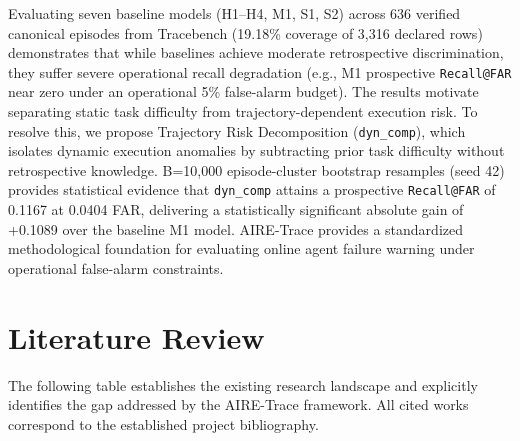 \documentclass[12pt,a4paper]{article}
\begin{document}
Evaluating seven baseline models (H1--H4, M1, S1, S2) across 636 verified canonical episodes from Tracebench (19.18\% coverage of 3,316 declared rows) demonstrates that while baselines achieve moderate retrospective discrimination, they suffer severe operational recall degradation (e.g., M1 prospective \texttt{Recall@FAR} near zero under an operational 5\% false-alarm budget). The results motivate separating static task difficulty from trajectory-dependent execution risk. To resolve this, we propose Trajectory Risk Decomposition (\texttt{dyn\_comp}), which isolates dynamic execution anomalies by subtracting prior task difficulty without retrospective knowledge. B=10,000 episode-cluster bootstrap resamples (seed 42) provides statistical evidence that \texttt{dyn\_comp} attains a prospective \texttt{Recall@FAR} of 0.1167 at 0.0404 FAR, delivering a statistically significant absolute gain of +0.1089 over the baseline M1 model. AIRE-Trace provides a standardized methodological foundation for evaluating online agent failure warning under operational false-alarm constraints.

\newpage


\newpage

\section{Literature Review}
The following table establishes the existing research landscape and explicitly identifies the gap addressed by the AIRE-Trace framework. All cited works correspond to the established project bibliography.
\end{document}
